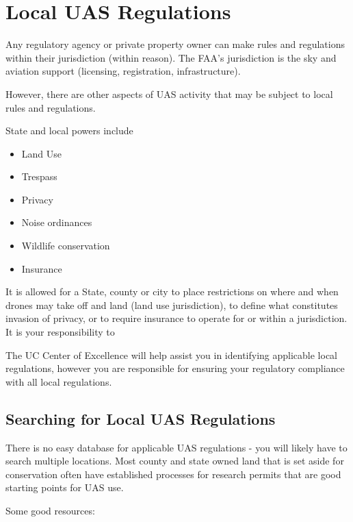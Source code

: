 \documentclass[
  12pt,
]{book}
\providecommand{\tightlist}{%
  \setlength{\itemsep}{0pt}\setlength{\parskip}{0pt}}
\begin{document}
\hypertarget{local-regulations}{%
\section{Local UAS Regulations}\label{local-regulations}}

Any regulatory agency or private property owner can make rules and regulations within their jurisdiction (within reason). The FAA's jurisdiction is the sky and aviation support (licensing, registration, infrastructure).

However, there are other aspects of UAS activity that may be subject to local rules and regulations.

State and local powers include

\begin{itemize}
\tightlist
\item
  Land Use
\item
  Trespass
\item
  Privacy
\item
  Noise ordinances
\item
  Wildlife conservation
\item
  Insurance
\end{itemize}

It is allowed for a State, county or city to place restrictions on where and when drones may take off and land (land use jurisdiction), to define what constitutes invasion of privacy, or to require insurance to operate for or within a jurisdiction. It is your responsibility to

The UC Center of Excellence will help assist you in identifying applicable local regulations, however you are responsible for ensuring your regulatory compliance with all local regulations.

\hypertarget{searching-for-local-uas-regulations}{%
\subsection{Searching for Local UAS Regulations}\label{searching-for-local-uas-regulations}}

There is no easy database for applicable UAS regulations - you will likely have to search multiple locations. Most county and state owned land that is set aside for conservation often have established processes for research permits that are good starting points for UAS use.

Some good resources:
\end{document}
